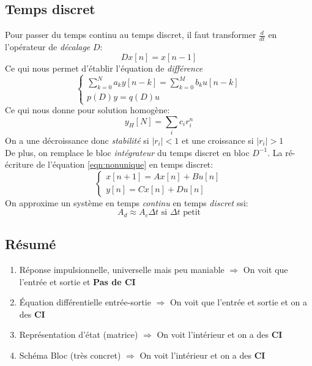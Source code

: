 \documentclass{report}
\begin{document}
\subsection{Temps discret}
Pour passer du temps continu au temps discret, il faut transformer $\frac{d}{dt}$ en l'opérateur de \textit{décalage} $D$:
\begin{equation}
Dx[n] =  x[n-1]
\end{equation}
Ce qui nous permet d'établir l'équation de \textit{différence}
\begin{equation}
\begin{cases}
\sum_{k=0}^N a_k y[n-k] = \sum_{k=0}^M b_ku[n-k]\\
p(D)y = q(D)u
\end{cases}
\end{equation}
Ce qui nous donne pour solution homogène:
\begin{equation}
y_H [N] = \sum_i c_i r_i^n
\end{equation}
On a une décroissance donc \textit{stabilité} si $|r_i| < 1$ et une croissance si $|r_i| > 1$\\
De plus, on remplace le bloc \textit{intégrateur} du temps discret en bloc $D^{-1}$. La ré-écriture de l'équation \ref{eqn:nonunique} en temps discret:
\begin{equation}
\begin{cases}
x[n+1] = Ax[n] + Bu[n]\\
y[n] = Cx[n] + Du[n]
\end{cases}
\end{equation}
On approxime un système en temps \textit{continu} en temps \textit{discret} ssi:
\begin{equation}
A_d \approx A_c \Delta t \text{ si } \Delta t \text{ petit}
\end{equation}

\subsection{Résumé}
\begin{enumerate}
\item Réponse impulsionnelle, universelle mais peu maniable $\Rightarrow$ On voit que l'entrée et sortie et \textbf{Pas de CI}
\item Équation différentielle entrée-sortie $\Rightarrow$ On voit que l'entrée et sortie et on a des \textbf{CI}
\item Représentation d'état (matrice) $\Rightarrow$ On voit l'intérieur et on a des \textbf{CI}
\item Schéma Bloc (très concret) $\Rightarrow$ On voit l'intérieur et on a des \textbf{CI}
\end{enumerate}
\end{document}

